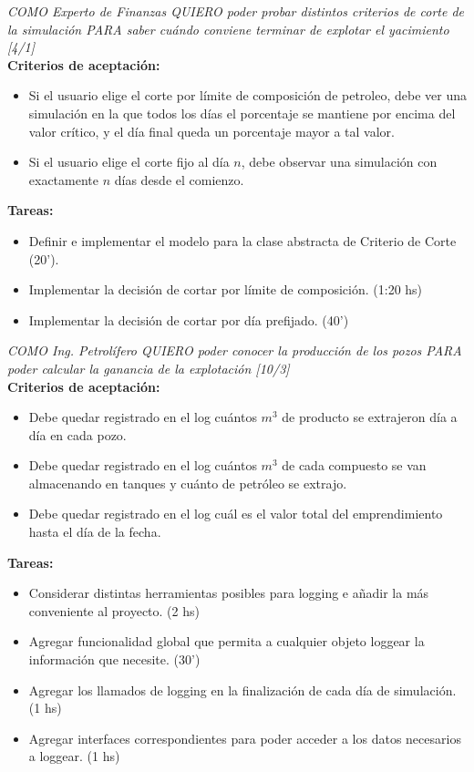 \begin{tcolorbox}
\textit{ COMO Experto de Finanzas QUIERO poder probar distintos criterios de corte de la simulación PARA saber cuándo conviene terminar de explotar el yacimiento [4/1]}\\

\textbf{Criterios de aceptación:}
\begin{itemize}
	\item Si el usuario elige el corte por límite de composición de petroleo, debe ver una simulación en la que todos los días el porcentaje se mantiene por encima del valor crítico, y el día final queda un porcentaje mayor a tal valor.
    \item Si el usuario elige el corte fijo al día $n$, debe observar una simulación con exactamente $n$ días desde el comienzo.
\end{itemize}

\textbf{Tareas:}
\begin{itemize}
	\item Definir e implementar el modelo para la clase abstracta de
    Criterio de Corte (20').
    \item Implementar la decisión de cortar por límite de composición. (1:20 hs)
    \item Implementar la decisión de cortar por día prefijado. (40')
\end{itemize}
\end{tcolorbox}

\begin{tcolorbox}
\textit{ COMO Ing. Petrolífero QUIERO poder conocer la producción de los pozos PARA poder calcular la ganancia de la explotación [10/3]}\\

\textbf{Criterios de aceptación:}
\begin{itemize}
	\item Debe quedar registrado en el log cuántos $m^3$ de producto se extrajeron día a día en cada pozo.
    \item Debe quedar registrado en el log cuántos $m^3$ de cada compuesto se van almacenando en tanques y cuánto de petróleo se extrajo.
    \item Debe quedar registrado en el log cuál es el valor total del emprendimiento hasta el día de la fecha.
\end{itemize}

\textbf{Tareas:}
\begin{itemize}
	\item Considerar distintas herramientas posibles para logging e añadir la más conveniente al proyecto. (2 hs)
  \item Agregar funcionalidad global que permita a cualquier objeto loggear la información que necesite. (30')
    \item Agregar los llamados de logging en la finalización de cada día de simulación. (1 hs)
    \item Agregar interfaces correspondientes para poder acceder a los datos necesarios a loggear. (1 hs)
\end{itemize}
\end{tcolorbox}

